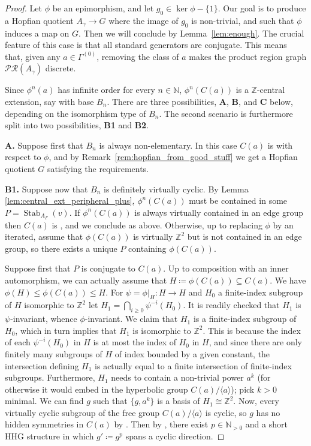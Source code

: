 \documentclass[svgnames]{amsart}
\theoremstyle{plain}
\theoremstyle{definition}
\newcommand{\Z}{\mathbb{Z}}
\newcommand{\Stab}[2]{\operatorname{Stab}_{#1}(#2)}
\begin{document}
\begin{proof}
Let $\phi$ be an epimorphism, and let $g_0\in \ker\phi-\{1\}$. Our goal is to produce a Hopfian quotient $A_\gamma\to G$ where the image of $g_0$ is non-trivial, and such that $\phi$ induces a map on $G$. Then we will conclude by Lemma~\ref{lem:enough}. The crucial feature of this case is that all standard generators are conjugate. This means that, given any $a\in \Gamma^{(0)}$, removing the class of $a$ makes the product region graph $\mathcal{PR}(A_\gamma)$ discrete. 



Since $\phi^n(a)$ has infinite order for every $n\in\mathbb{N}$, $\phi^n(C(a))$ is a $\mathbb Z$-central extension, say with base $B_n$. There are three possibilities, \textbf{A}, \textbf{B}, and \textbf{C} below, depending on the isomorphism type of $B_n$. The second scenario is furthermore split into two possibilities, \textbf{B1} and \textbf{B2}.
   \par\medskip
\textbf{A.} Suppose first that $B_n$ is always non-elementary. In this case $C(a)$ is \good{} with respect to $\phi$, and by Remark~\ref{rem:hopfian_from_good_stuff} we get a Hopfian quotient $G$ satisfying the requirements.
   \par\medskip
\textbf{B1.} Suppose now that $B_n$ is definitely virtually cyclic. By Lemma \ref{lem:central_ext_peripheral_plus}, $\phi^n(C(a))$ must be contained in some $P=\Stab{A_\Gamma}{v}$. If $\phi^n(C(a))$ is always virtually contained in an edge group then $C(a)$ is \good{}, and we conclude as above. Otherwise, up to replacing $\phi$ by an iterated, assume that $\phi(C(a))$ is virtually $\Z^2$ but is not contained in an edge group, so there exists a unique $P$ containing $\phi(C(a))$.
\par\medskip
Suppose first that $P$ is conjugate to $C(a)$. Up to composition with an inner automorphism, we can actually assume that $H\coloneq \phi(C(a))\subseteq C(a)$. We have $\phi(H)\le\phi(C(a))\le H$. For $\psi=\phi|_H\colon H\to H$ and $H_0$ a finite-index subgroup of $H$ isomorphic to $\mathbb Z^2$ let $H_1=\bigcap_{i\geq 0} \psi^{-i}(H_0)$. It is readily checked that $H_1$ is $\psi$-invariant, whence $\phi$-invariant. We claim that $H_1$ is a finite-index subgroup of $H_0$, which in turn implies that $H_1$ is isomorphic to $\mathbb Z^2$. This is because the index of each $\psi^{-i}(H_0)$ in $H$ is at most the index of $H_0$ in $H$, and since there are only finitely many subgroups of $H$ of index bounded by a given constant, the intersection defining $H_1$ is actually equal to a finite intersection of finite-index subgroups. Furthermore, $H_1$ needs to contain a non-trivial power $a^k$ (for otherwise it would embed in the hyperbolic group $C(a)/\langle a\rangle$); pick $k>0$ minimal. We can find $g$ such that $\{g,a^k\}$ is a basis of $H_1\cong\mathbb Z^2$. Now, every virtually cyclic subgroup of the free group $C(a)/\langle a\rangle$ is cyclic, so $g$ has no hidden symmetries in $C(a)$ by \cite[Remark 5.4]{Short_HHG:I}. Then by \cite[Proposition 5.2]{Short_HHG:I}, there exist $p\in \mathbb{N}_{>0}$ and a short HHG structure in which $g'\coloneq g^p$ spans a cyclic direction. 


\end{proof}
\end{document}

